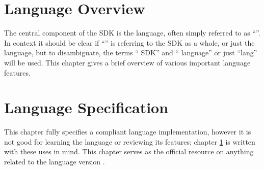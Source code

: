 \chapter{\gx{} Language Overview}
\label{chap:lang-overview}

The central component of the \gx{} SDK is the \gx{} language, often
simply referred to as ``\gx{}''. In context it should be clear if
``\gx{}'' is referring to the SDK as a whole, or just the language,
but to disambiguate, the terms ``\gx{} SDK'' and ``\gx{} language'' or
just ``\gx{}lang'' will be used. This chapter gives a brief overview of
various important language features.







\chapter{\gx{} Language Specification}
\label{chap:lang-spec}

This chapter fully specifies a compliant \gx{} language implementation,
however it is not good for learning the language or reviewing its
features; chapter \ref{chap:lang-overview} is written with these uses in
mind. This chapter serves as the official resource on anything related
to the \gx{} language version \gxVersion{}.



